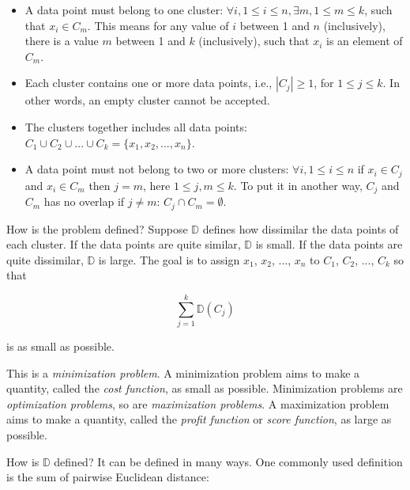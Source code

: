 \begin{itemize}
\item A data point must belong to one cluster: $\forall i, 1 \le i \le
  n, \exists m, 1 \le m \le k$, such that $x_i \in C_m$. This means
  for any value of $i$ between 1 and $n$ (inclusively), there is a
  value $m$ between 1 and $k$ (inclusively), such that $x_i$ is an
  element of $C_m$.

  
\item Each cluster contains one or more data points, i.e.,
  $|C_j| \ge 1$, for $1 \le j \le k$.  In other words, an
  empty cluster cannot be accepted.
  
\item The clusters together includes all data points: $C_1 \cup C_2
  \cup ... \cup C_k = \{x_1, x_2, ..., x_n\}$.

\item A data point must not belong to two or more clusters: $\forall
  i, 1 \le i \le n$ if $x_i \in C_j$ and $x_i \in C_m$ then $j = m$,
  here $1 \le j, m \le k$.  To put it in another way, $C_j$ and $C_m$
  has no overlap if $j \ne m$: $C_j \cap C_m = \emptyset$.
  
\end{itemize}

How is the problem defined? Suppose $\mathds{D}$ defines how
dissimilar the data points of each cluster.  If the data points are
quite similar, $\mathds{D}$ is small.  If the data points are quite
dissimilar, $\mathds{D}$ is large.  The goal is to assign
$x_1$, $x_2$, ..., $x_n$ to $C_1$, $C_2$, ..., $C_k$
so that

\begin{equation}
  \underset{j = 1}{\overset{k}{\sum}} \mathds{D}(C_j)
  \label{eqn:kmeancost1}
\end{equation}

is as small as possible.

This is a {\it minimization problem}. A minimization problem aims to
make a quantity, called the {\it cost function}, as small as possible.
Minimization problems are {\it optimization problems}, so are {\it
  maximization problems}.  A maximization problem aims to make a
quantity, called the {\it profit function} or {\it score function}, as
large as possible.


How is $\mathds{D}$ defined?  It can be defined in many ways. One commonly
used definition is the sum of pairwise Euclidean distance:


